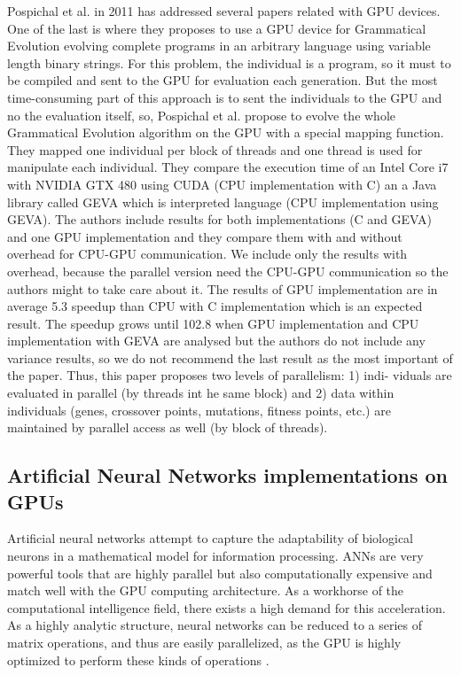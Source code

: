 \documentclass[prodmode,acmtecs]{acmsmall}
\begin{document}
Pospichal et al. in 2011 has addressed several papers related with GPU devices. One of the last is \cite{DBLP:conf/gecco/PospichalMOSJ11} where they proposes to use a GPU device for Grammatical Evolution evolving complete programs in an arbitrary language using variable length binary strings. For this problem, the individual is a program, so it must to be compiled and sent to the GPU for evaluation each generation. But the most time-consuming part of this approach is to sent the individuals to the GPU and no the evaluation itself, so, Pospichal et al. propose to evolve the whole Grammatical Evolution algorithm on the GPU with a special mapping function. They mapped one individual per block of threads and one thread is used for manipulate each individual. They compare the execution time of an Intel Core i7 with NVIDIA GTX 480 using CUDA (CPU implementation with C) an a Java library called GEVA \cite{O'Neill:2008:GGE:1527063.1527066} which is interpreted language (CPU implementation using GEVA).  The authors include results for both implementations (C and GEVA) and one GPU implementation and they compare them with and without overhead for CPU-GPU communication. We include only the results with overhead, because the parallel version need the CPU-GPU communication so the authors might to take care about it. The results of GPU implementation are in average 5.3 speedup than CPU with C implementation which is an expected result. The speedup grows until 102.8 when GPU implementation and CPU implementation with GEVA are analysed but the authors do not include any variance results, so we do not recommend the last result as the most important of the paper. Thus, this paper proposes two levels of parallelism: 1) indi-
viduals are evaluated in parallel (by threads int he same block) and 2) data within individuals (genes, crossover points, mutations, fitness points, etc.) are maintained by parallel access as well (by block of threads).



\subsection{Artificial Neural Networks implementations on GPUs}

Artificial neural networks attempt to capture the adaptability of biological neurons in a mathematical model for information processing. ANNs are very powerful tools that are highly parallel but also computationally expensive and match well with the GPU computing architecture.  As a workhorse of the computational intelligence field, there exists a high demand for  this acceleration.  As a highly analytic structure, neural networks can be reduced to a series of matrix operations, and thus are easily parallelized, as the GPU is highly optimized to perform these kinds of operations \cite{Meuth2006}.  
\end{document}
